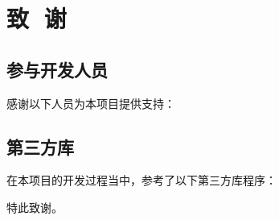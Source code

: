 \chapter{致\,\,\,\,谢}

\section{参与开发人员}

感谢以下人员为本项目提供支持：


\section{第三方库}

在本项目的开发过程当中，参考了以下第三方库程序：



特此致谢。
